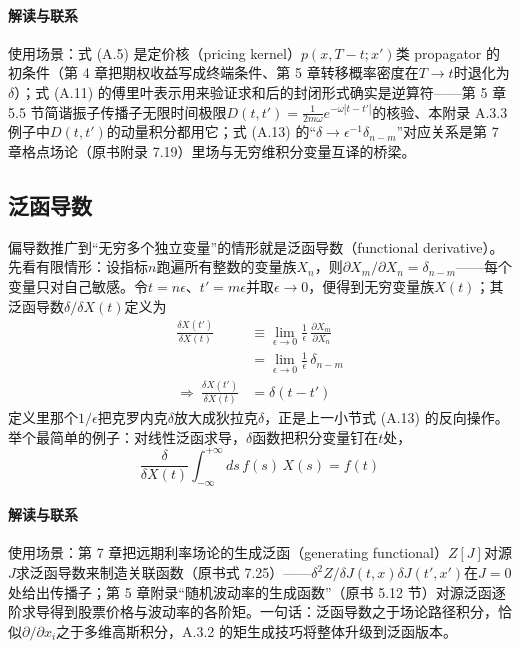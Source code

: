 \paragraph{解读与联系}
使用场景：式 (A.5) 是定价核（pricing kernel）$p(x,T-t;x')$类 propagator 的初条件（第 4 章把期权收益写成终端条件、第 5 章转移概率密度在$T\to t$时退化为$\delta$）；式 (A.11) 的傅里叶表示用来验证求和后的封闭形式确实是逆算符——第 5 章 5.5 节简谐振子传播子无限时间极限$D(t,t')=\frac{1}{2m\omega}e^{-\omega|t-t'|}$的核验、本附录 A.3.3 例子中$D(t,t')$的动量积分都用它；式 (A.13) 的“$\delta\to\epsilon^{-1}\delta_{n-m}$”对应关系是第 7 章格点场论（原书附录 7.19）里场与无穷维积分变量互译的桥梁。

\subsection{泛函导数}

偏导数推广到“无穷多个独立变量”的情形就是泛函导数（functional derivative）。先看有限情形：设指标$n$跑遍所有整数的变量族$X_n$，则$\partial X_m/\partial X_n=\delta_{n-m}$——每个变量只对自己敏感。令$t=n\epsilon$、$t'=m\epsilon$并取$\epsilon\to 0$，便得到无穷变量族$X(t)$；其泛函导数$\delta/\delta X(t)$定义为
\begin{align*}
\frac{\delta X(t')}{\delta X(t)}
&\equiv\lim_{\epsilon\to 0}\frac{1}{\epsilon}\,
\frac{\partial X_m}{\partial X_n}\\
&=\lim_{\epsilon\to 0}\frac{1}{\epsilon}\,\delta_{n-m}\\
\Rightarrow\ \frac{\delta X(t')}{\delta X(t)}&=\delta(t-t')
\tag{A.15}
\end{align*}
定义里那个$1/\epsilon$把克罗内克$\delta$放大成狄拉克$\delta$，正是上一小节式 (A.13) 的反向操作。举个最简单的例子：对线性泛函求导，$\delta$函数把积分变量钉在$t$处，
\begin{equation*}
\frac{\delta}{\delta X(t)}\int_{-\infty}^{+\infty}ds\,f(s)\,X(s)=f(t)
\end{equation*}

\paragraph{解读与联系}
使用场景：第 7 章把远期利率场论的生成泛函（generating functional）$Z[J]$对源$J$求泛函导数来制造关联函数（原书式 7.25）——$\delta^2 Z/\delta J(t,x)\delta J(t',x')$在$J=0$处给出传播子；第 5 章附录“随机波动率的生成函数”（原书 5.12 节）对源泛函逐阶求导得到股票价格与波动率的各阶矩。一句话：泛函导数之于场论路径积分，恰似$\partial/\partial x_i$之于多维高斯积分，A.3.2 的矩生成技巧将整体升级到泛函版本。

